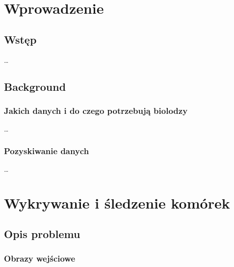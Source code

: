 \documentclass[declaration,shortabstract,mgr]{iithesis}
\author         {Artur Rosa}
\begin{document}

\chapter{Wprowadzenie}



\section{Wstęp}

\ldots %

\section{Background}

\subsection{Jakich danych i do czego potrzebują biolodzy}

\ldots %

\subsection{Pozyskiwanie danych}

\ldots %



\chapter{Wykrywanie i śledzenie komórek}
\label{cha:detection-and-tracking}



\section{Opis problemu}
\label{sec:problem}

\subsection{Obrazy wejściowe}
\label{sec:input-images}
\end{document}
